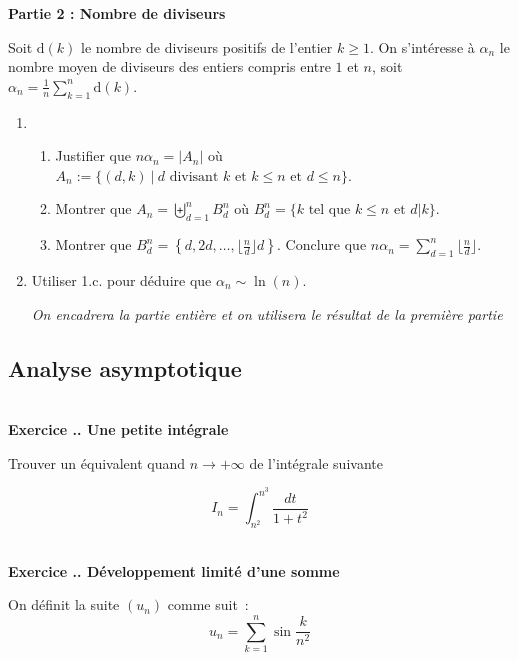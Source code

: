\documentclass{article}
\newcommand{\di}{\mathrm{d}}
\newcounter{exo}
\newcommand{\exercice}[1][\null]{\textbf{\\ Exercice \thesection.\theexo. #1} \addtocounter{exo}{1}}
\begin{document}
{\setlength{\parindent}{0cm}
\textbf{Partie 2 : Nombre de diviseurs}}

Soit $\di(k)$ le nombre de diviseurs positifs de l'entier $k \ge 1$. On s'intéresse à $\alpha_n$ le nombre moyen de diviseurs des entiers compris entre $1$ et $n$, soit $ \alpha_n  = \frac{1}{n} \sum_{k=1}^n \di(k) $.

\begin{enumerate}

\item \begin{enumerate} \item Justifier que $n \alpha_n = |A_n|$ où $A_n := \{(d,k)~|~d \text{ divisant } k \text{ et } k \le n \text{ et } d \le n\}$.

\item Montrer que $\displaystyle A_n = \biguplus_{d=1}^n B_d^n$ où $B_d^n = \{k \text{ tel que } k \le n \text{ et } d | k\}$.

\item Montrer que $B_d^n = \left\{d, 2d, \dots, \lfloor \frac{n}{d} \rfloor d \right\}$. Conclure que $n \alpha_n = \sum_{d =1}^n \lfloor \frac{n}{d}\rfloor$.

\end{enumerate}

\item Utiliser 1.c. pour déduire que $\alpha_n \sim \ln(n)$.

\emph{On encadrera la partie entière et on utilisera le résultat de la première partie}

\end{enumerate}





\subsection{Analyse asymptotique}

\exercice[Une petite intégrale]
Trouver un équivalent quand $n \to +\infty$
de l'intégrale suivante

\begin{equation*}
    I_n = \int_{n^2}^{n^3} \frac{dt}{1 + t^2} 
\end{equation*}

\exercice[Développement limité d'une somme]
On définit la suite $(u_n)$ comme suit~:
\begin{equation*}
    u_n = \sum_{k = 1}^n \sin \frac{k}{n^2}
\end{equation*}
\end{document}
